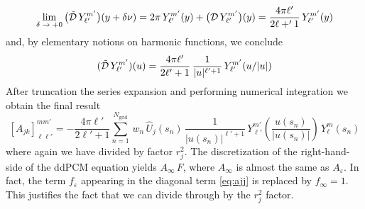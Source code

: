 \[
\lim_{\delta \; \to \; + 0} \big(\tilde{\mathcal{D}} \, Y_{\ell'}^{m'}\big)(y + \delta \nu) =  2\pi \,Y_{\ell'}^{m'}(y)+ \big( \mathcal{D} \, Y_{\ell'}^{m'} \big)(y) = \frac{4 \pi \ell'}{2 \ell +' 1} \, Y_{\ell'}^{m'}(y)
\]
and, by elementary notions on harmonic functions, we conclude
\[
(\tilde{\mathcal{D}} \, Y_{\ell'}^{m'})(u) = \frac{4 \pi \ell'}{2 \ell' + 1} \, \frac{1}{|u|^{\ell' + 1}} \,  Y_{\ell'}^{m'}(u/|u|)
\]
After truncation the series expansion and performing numerical integration we obtain the final result
\begin{equation}\label{eq:ajk}
[A_{jk}]_{\ell \ell'}^{m m'} =-  \frac{4 \pi \ell'}{2 \ell' + 1}  \sum_{n=1}^{N_\text{grid}} \, w_n  \,  \hat{U}_j(s_n) \, \frac{1}{|u(s_n)|^{\ell' + 1}} \, Y_{\ell'}^{m'}\left(\frac{u(s_n)}{|u(s_n)|}\right) \, Y_{\ell}^{m}(s_n)
\end{equation}
where again we have divided by factor $r_j^2$. The discretization of the right-hand-side of the ddPCM equation yields $A_\infty \, F$, where $A_\infty$ is almost the same as $A_\varepsilon$. In fact, the term $f_\varepsilon$ appearing in the diagonal term \eqref{eq:ajj} is replaced by $f_\infty = 1$. This justifies the fact that we can divide through by the $r_j^2$ factor.